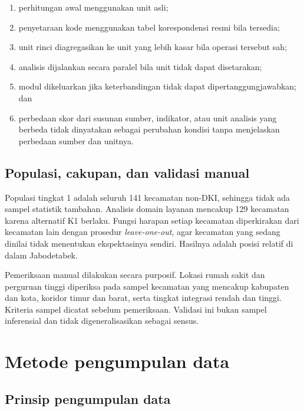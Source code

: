 \documentclass[12pt,a4paper,oneside,openany,indonesian]{report}
\begin{document}
\begin{enumerate}
\tightlist
\item
  perhitungan awal menggunakan unit asli;
\item
  penyetaraan kode menggunakan tabel korespondensi resmi bila tersedia;
\item
  unit rinci diagregasikan ke unit yang lebih kasar bila operasi tersebut
  sah;
\item
  analisis dijalankan secara paralel bila unit tidak dapat disetarakan;
\item
  modul dikeluarkan jika keterbandingan tidak dapat dipertanggungjawabkan;
  dan
\item
  perbedaan skor dari susunan sumber, indikator, atau unit analisis yang
  berbeda tidak dinyatakan sebagai perubahan kondisi tanpa menjelaskan
  perbedaan sumber dan unitnya.
\end{enumerate}

\subsection{Populasi, cakupan, dan validasi
manual}\label{populasi-cakupan-dan-validasi-manual}

Populasi tingkat 1 adalah seluruh 141 kecamatan non-DKI, sehingga tidak
ada sampel statistik tambahan. Analisis domain layanan mencakup 129
kecamatan karena alternatif K1 berlaku.
Fungsi harapan setiap kecamatan diperkirakan dari kecamatan lain dengan
prosedur \emph{leave-one-out}, agar kecamatan yang sedang dinilai tidak
menentukan ekspektasinya sendiri. Hasilnya adalah posisi relatif di dalam
Jabodetabek.

Pemeriksaan manual dilakukan secara purposif. Lokasi rumah sakit dan
perguruan tinggi diperiksa pada sampel kecamatan yang mencakup
kabupaten dan kota, koridor timur dan barat, serta tingkat integrasi
rendah dan tinggi. Kriteria sampel dicatat sebelum pemeriksaan.
Validasi ini bukan sampel inferensial dan tidak digeneralisasikan
sebagai sensus.

\section{Metode pengumpulan data}\label{metode-pengumpulan-data}

\subsection{Prinsip pengumpulan
data}\label{prinsip-pengumpulan-data}
\end{document}
